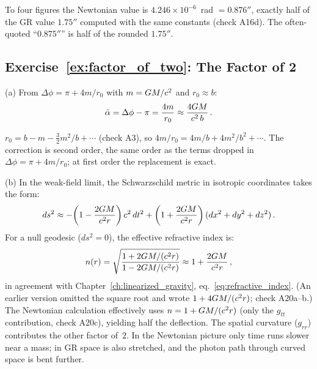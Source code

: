 \begin{annotation}[Rounding]
To four figures the Newtonian value is $4.246\times10^{-6}$~rad
$= 0.876''$, exactly half of the GR value $1.75''$ computed with the same
constants (check A16d).  The often-quoted ``$0.875''$'' is half of the rounded
$1.75''$.
\end{annotation}
\subsection*{Exercise~\ref{ex:factor_of_two}: The Factor of 2}

(a) From $\Delta\phi = \pi + 4m/r_0$ with
$m = G M / c^2$ and $r_0 \approx b$:
\begin{equation*}
    \hat{\alpha} = \Delta\phi - \pi = \frac{4m}{r_0}
    \approx \frac{4G M}{c^2\, b} \,.
\end{equation*}


\begin{annotation}
$r_0 = b - m - \tfrac32 m^2/b + \cdots$ (check A3), so
$4m/r_0 = 4m/b + 4m^2/b^2 + \cdots$.  The correction is second order, the same
order as the terms dropped in $\Delta\phi = \pi + 4m/r_0$; at first order the
replacement is exact.
\end{annotation}
(b) In the weak-field limit, the Schwarzschild metric in
isotropic coordinates takes the form:
\begin{equation*}
    ds^2 \approx -\!\left(1 - \frac{2G M}{c^2 r}\right)
    c^2\, dt^2
    + \left(1 + \frac{2G M}{c^2 r}\right)
    (dx^2 + dy^2 + dz^2) \,.
\end{equation*}
For a null geodesic ($ds^2 = 0$), the effective refractive index is:
\begin{equation*}
    n(r) = \sqrt{\frac{1 + 2G M / (c^2 r)}
    {1 - 2G M / (c^2 r)}}
    \approx 1 + \frac{2G M}{c^2 r} \,,
\end{equation*}
in agreement with Chapter~\ref{ch:linearized_gravity}, eq.~\eqref{eq:refractive_index}.  (An earlier
version omitted the square root and wrote $1 + 4G M/(c^2 r)$;
check A20a--b.)  The Newtonian calculation effectively uses
$n = 1 + G M/(c^2 r)$ (only the $g_{tt}$ contribution,
check A20c), yielding half the deflection.  The spatial curvature ($g_{rr}$) contributes the other factor
of~$2$.  In the Newtonian picture only time runs slower near a mass; in GR
space is also stretched, and the photon path through curved space is bent
further.


